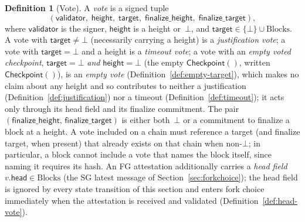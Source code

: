 \ifx\litemode\undefined\documentclass{article}\fi
\newcommand{\target}{\mathsf{target}}
\newcommand{\height}{\mathsf{height}}
\newcommand{\validator}{\mathsf{validator}}
\newcommand{\finalizeHeight}{\mathsf{finalize\_height}}
\newcommand{\finalizeTarget}{\mathsf{finalize\_target}}
\newcommand{\headf}{\mathsf{head}}          %
\newcommand{\emptyckpt}{\ensuremath{\mathsf{Checkpoint}()}} %
\theoremstyle{plain}
\theoremstyle{definition}
\newtheorem{definition}{Definition}
\theoremstyle{remark}
\begin{document}
\begin{definition}[Vote]\label{def:vote}
A \emph{vote} is a signed tuple
\[
  (\validator,\; \height,\; \target,\; \finalizeHeight,\; \finalizeTarget),
\]
where $\validator$ is the signer, $\height$ is a height or~$\bot$, and $\target \in \{\bot\} \cup \mathrm{Blocks}$.
A vote with $\target \neq \bot$ (necessarily carrying a height) is a \emph{justification vote}; a vote with $\target = \bot$ and a height is a \emph{timeout vote}; a vote with an \emph{empty voted checkpoint}, $\target = \bot$ \emph{and} $\height = \bot$ (the empty $\mathsf{Checkpoint}()$, written~$\emptyckpt$), is an \emph{empty vote} (Definition~\ref{def:empty-target}), which makes no claim about any height and so contributes to neither a justification (Definition~\ref{def:justification}) nor a timeout (Definition~\ref{def:timeout}); it acts only through its head field and its finalize commitment.
The pair $(\finalizeHeight,\, \finalizeTarget)$ is either both~$\bot$ or a commitment to finalize a block at a height.
A vote included on a chain must reference a target (and finalize target, when present) that already exists on that chain when non-$\bot$; in particular, a block cannot include a vote that names the block itself, since naming it requires its hash.
An FG attestation additionally carries a \emph{head field}~$v.\headf \in \mathrm{Blocks}$ (the SG latest message of Section~\ref{sec:forkchoice}); the head field is ignored by every state transition of this section and enters fork choice immediately when the attestation is received and validated (Definition~\ref{def:head-vote}).
\end{definition}
\end{document}
